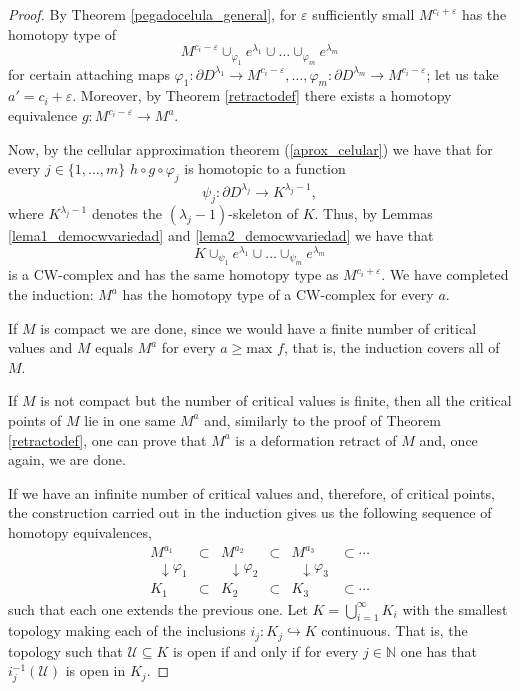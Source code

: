 \begin{proof}
    By Theorem \ref{pegadocelula_general}, for $\varepsilon$ sufficiently small $M^{c_i+\varepsilon}$ has the homotopy type of
    \begin{equation*}
        M^{c_i - \varepsilon}\cup_{\varphi_1} e^{\lambda_1} \cup\dots\cup_{\varphi_m} e^{\lambda_m}
    \end{equation*}
    for certain attaching maps $\varphi_1:\partial D^{\lambda_1}\to M^{c_i - \varepsilon},\dots,\varphi_m: \partial D^{\lambda_m}\to M^{c_i - \varepsilon}$; let us take $a'=c_i+\varepsilon$. Moreover, by Theorem \ref{retractodef} there exists a homotopy equivalence $g: M^{c_i-\varepsilon}\to M^a$.

    Now, by the cellular approximation theorem (\ref{aprox_celular}) we have that for every $j\in\{1,\dots,m\}$ $h\circ g\circ\varphi_j$ is homotopic to a function
    \begin{equation*}
        \psi_j: \partial D^{\lambda_j} \to K^{\lambda_j - 1},
    \end{equation*}
    where $K^{\lambda_j - 1}$ denotes the $(\lambda_j -1)$-skeleton of $K$. Thus, by Lemmas \ref{lema1_democwvariedad} and \ref{lema2_democwvariedad} we have that
    \begin{equation*}
        K\cup_{\psi_1} e^{\lambda_1} \cup\dots\cup_{\psi_m} e^{\lambda_m}
    \end{equation*}
    is a CW-complex and has the same homotopy type as $M^{c_i+\varepsilon}$. We have completed the induction: $M^a$ has the homotopy type of a CW-complex for every $a$.

    If $M$ is compact we are done, since we would have a finite number of critical values and $M$ equals $M^a$ for every $a\ge \text{max }f$, that is, the induction covers all of $M$.

    If $M$ is not compact but the number of critical values is finite, then all the critical points of $M$ lie in one same $M^a$ and, similarly to the proof of Theorem \ref{retractodef}, one can prove that $M^a$ is a deformation retract of $M$ and, once again, we are done.

    If we have an infinite number of critical values and, therefore, of critical points, the construction carried out in the induction gives us the following sequence of homotopy equivalences,
    \[
        \begin{array}{cccccc}
            M^{a_1} & \subset & M^{a_2} & \subset & M^{a_3} & \subset \cdots \\
            \;\;\downarrow{\varphi_1} & & \;\;\downarrow{\varphi_2} & & \;\;\downarrow{\varphi_3} & \\
            K_1 & \subset & K_2 & \subset & K_3 & \subset \cdots
        \end{array}
    \]
    such that each one extends the previous one. Let $K=\bigcup_{i=1}^{\infty} K_i$ with the smallest topology making each of the inclusions $i_j:K_j\hookrightarrow K$ continuous. That is, the topology such that $\mathcal{U}\subseteq K$ is open if and only if for every $j\in \mathbb{N}$ one has that $i_j^{-1}(\mathcal{U})$ is open in $K_j$.


\end{proof}
